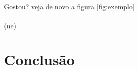 \documentclass[12pt,a4paper,oneside,brazil]{abntex2}
\begin{document}
\lipsum[1-2]

Gostou? veja de novo a figura \ref{fig:exemplo}\\\\
(\acrshort{ue})

\chapter{Conclusão}
\lipsum[11-12]


\end{document}
